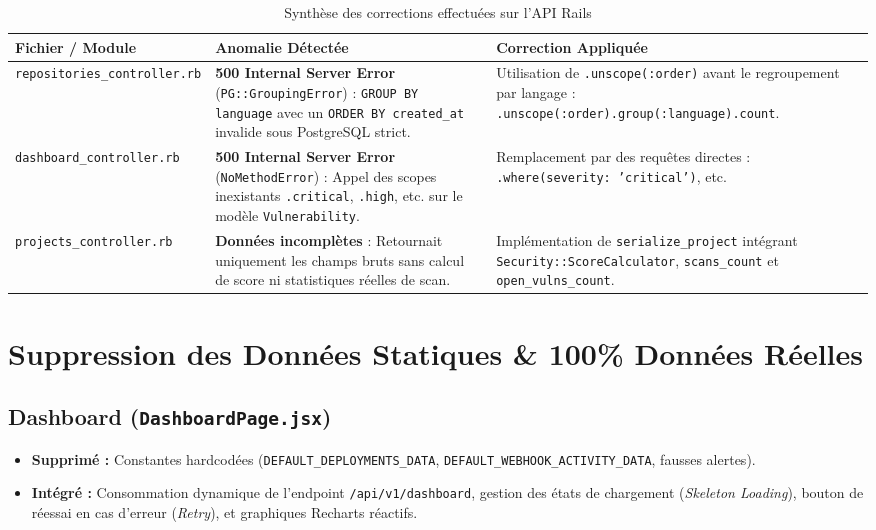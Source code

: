 \documentclass[11pt,a4paper]{article}
\begin{document}
\begin{table}[H]
\centering
\small
\begin{tabularx}{\textwidth}{p{4.5cm} p{5.5cm} X}
\toprule
\textbf{Fichier / Module} & \textbf{Anomalie Détectée} & \textbf{Correction Appliquée} \\
\midrule
\texttt{repositories\_controller.rb} & \textbf{500 Internal Server Error} (\texttt{PG::GroupingError}) : \texttt{GROUP BY language} avec un \texttt{ORDER BY created\_at} invalide sous PostgreSQL strict. & Utilisation de \texttt{.unscope(:order)} avant le regroupement par langage : \newline \texttt{.unscope(:order).group(:language).count}. \\
\addlinespace
\texttt{dashboard\_controller.rb} & \textbf{500 Internal Server Error} (\texttt{NoMethodError}) : Appel des scopes inexistants \texttt{.critical}, \texttt{.high}, etc. sur le modèle \texttt{Vulnerability}. & Remplacement par des requêtes directes : \newline \texttt{.where(severity: 'critical')}, etc. \\
\addlinespace
\texttt{projects\_controller.rb} & \textbf{Données incomplètes} : Retournait uniquement les champs bruts sans calcul de score ni statistiques réelles de scan. & Implémentation de \texttt{serialize\_project} intégrant \texttt{Security::ScoreCalculator}, \texttt{scans\_count} et \texttt{open\_vulns\_count}. \\
\bottomrule
\end{tabularx}
\caption{Synthèse des corrections effectuées sur l'API Rails}
\end{table}

\section{Suppression des Données Statiques \& 100\% Données Réelles}
\label{sec:realdata}

\subsection{Dashboard (\texttt{DashboardPage.jsx})}
\begin{itemize}[leftmargin=*]
    \item \textbf{Supprimé :} Constantes hardcodées (\texttt{DEFAULT\_DEPLOYMENTS\_DATA}, \texttt{DEFAULT\_WEBHOOK\_ACTIVITY\_DATA}, fausses alertes).
    \item \textbf{Intégré :} Consommation dynamique de l'endpoint \texttt{/api/v1/dashboard}, gestion des états de chargement (\textit{Skeleton Loading}), bouton de réessai en cas d'erreur (\textit{Retry}), et graphiques Recharts réactifs.
\end{itemize}
\end{document}
